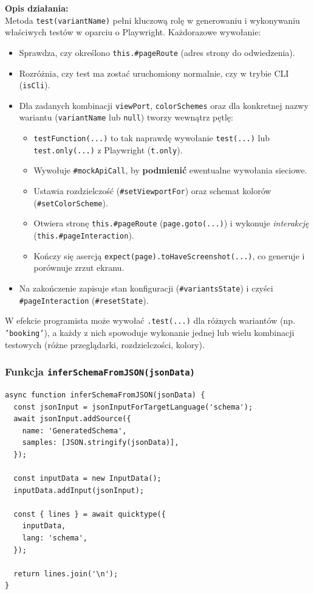 \documentclass[12pt]{report}
\begin{document}
\noindent
\textbf{Opis działania:}\\
Metoda \verb|test(variantName)| pełni kluczową rolę w generowaniu i wykonywaniu właściwych testów w oparciu o Playwright. Każdorazowe wywołanie:
\begin{itemize}
  \item Sprawdza, czy określono \verb|this.#pageRoute| (adres strony do odwiedzenia).
  \item Rozróżnia, czy test ma zostać uruchomiony normalnie, czy w trybie CLI (\texttt{isCli}).
  \item Dla zadanych kombinacji \verb|viewPort|, \verb|colorSchemes| oraz dla konkretnej nazwy wariantu (\verb|variantName| lub \verb|null|) tworzy wewnątrz pętlę:
    \begin{itemize}
      \item \verb|testFunction(...)| to tak naprawdę wywołanie \verb|test(...)| lub \verb|test.only(...)| z Playwright (\verb|t.only|).
      \item Wywołuje \verb|#mockApiCall|, by \textbf{podmienić} ewentualne wywołania sieciowe.
      \item Ustawia rozdzielczość (\verb|#setViewportFor|) oraz schemat kolorów (\verb|#setColorScheme|).
      \item Otwiera stronę \verb|this.#pageRoute| (\verb|page.goto(...)|) i wykonuje \textit{interakcję} (\verb|this.#pageInteraction|).
      \item Kończy się asercją \verb|expect(page).toHaveScreenshot(...)|, co generuje i porównuje zrzut ekranu.
    \end{itemize}
  \item Na zakończenie zapisuje stan konfiguracji (\verb|#variantsState|) i czyści \verb|#pageInteraction| (\verb|#resetState|).
\end{itemize}

W efekcie programista może wywołać \verb|.test(...)| dla różnych wariantów (np. \texttt{'booking'}), a każdy z nich spowoduje wykonanie jednej lub wielu kombinacji testowych (różne przeglądarki, rozdzielczości, kolory).

\subsubsection{Funkcja \texttt{inferSchemaFromJSON(jsonData)}}
\label{sec:inferSchemaFromJSON}

\begin{verbatim}
async function inferSchemaFromJSON(jsonData) {
  const jsonInput = jsonInputForTargetLanguage('schema');
  await jsonInput.addSource({
    name: 'GeneratedSchema',
    samples: [JSON.stringify(jsonData)],
  });

  const inputData = new InputData();
  inputData.addInput(jsonInput);

  const { lines } = await quicktype({
    inputData,
    lang: 'schema',
  });

  return lines.join('\n');
}
\end{verbatim}
\end{document}
